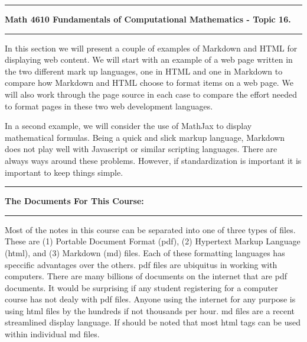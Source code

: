 \documentclass[10pt,fleqn]{article}
\begin{document}
\vskip0.1in\hrule\vskip0.1in \noindent
{\bf Math 4610 Fundamentals of Computational Mathematics  - Topic 16.}
\vskip0.1in\hrule\vskip0.1in \noindent
In this section we will present a couple of examples of Markdown and HTML for
displaying web content. We will start with an example of a web page written in
the two different mark up languages, one in HTML and one in Markdown to compare
how Markdown and HTML choose to format items on a web page. We will also work
through the page source in each case to compare the effort needed to format
pages in these two web development languages.

In a second example, we will consider the use of MathJax to display mathematical
formulas. Being a quick and slick markup language, Markdown does not play well
with Javascript or similar scripting languages. There are always ways around 
these problems. However, if standardization is important it is important to keep
things simple.
\vskip0.1in\hrule\vskip0.1in \noindent
{\bf The Documents For This Course:}
\vskip0.1in\hrule\vskip0.1in \noindent
Most of the notes in this course can be separated into one of three types of
files. These are (1) Portable Document Format (pdf), (2) Hypertext Markup
Language (html), and (3) Markdown (md) files. Each of these formatting languages
has speccific advantages over the others. pdf files are ubiquitus in working
with computers. There are many billions of documents on the internet that are
pdf documents. It would be surprising if any student registering for a computer
course has not dealy with pdf files. Anyone using the internet for any purpose
is using html files by the hundreds if not thousands per hour. md files are a
recent streamlined display language. If should be noted that most html tags can
be used within individual md files.
\end{document}
